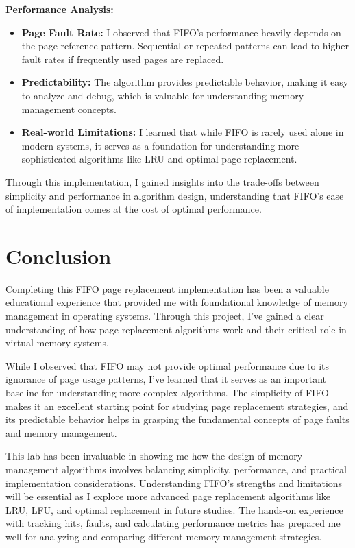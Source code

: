 \documentclass[12pt,a4paper]{article}
\begin{document}
\textbf{Performance Analysis:}
\begin{itemize}
    \item \textbf{Page Fault Rate:} I observed that FIFO's performance heavily depends on the page reference pattern. Sequential or repeated patterns can lead to higher fault rates if frequently used pages are replaced.
    \item \textbf{Predictability:} The algorithm provides predictable behavior, making it easy to analyze and debug, which is valuable for understanding memory management concepts.
    \item \textbf{Real-world Limitations:} I learned that while FIFO is rarely used alone in modern systems, it serves as a foundation for understanding more sophisticated algorithms like LRU and optimal page replacement.
\end{itemize}

Through this implementation, I gained insights into the trade-offs between simplicity and performance in algorithm design, understanding that FIFO's ease of implementation comes at the cost of optimal performance.

\section{Conclusion}
Completing this FIFO page replacement implementation has been a valuable educational experience that provided me with foundational knowledge of memory management in operating systems. Through this project, I've gained a clear understanding of how page replacement algorithms work and their critical role in virtual memory systems.

While I observed that FIFO may not provide optimal performance due to its ignorance of page usage patterns, I've learned that it serves as an important baseline for understanding more complex algorithms. The simplicity of FIFO makes it an excellent starting point for studying page replacement strategies, and its predictable behavior helps in grasping the fundamental concepts of page faults and memory management.

This lab has been invaluable in showing me how the design of memory management algorithms involves balancing simplicity, performance, and practical implementation considerations. Understanding FIFO's strengths and limitations will be essential as I explore more advanced page replacement algorithms like LRU, LFU, and optimal replacement in future studies. The hands-on experience with tracking hits, faults, and calculating performance metrics has prepared me well for analyzing and comparing different memory management strategies.
\end{document}
